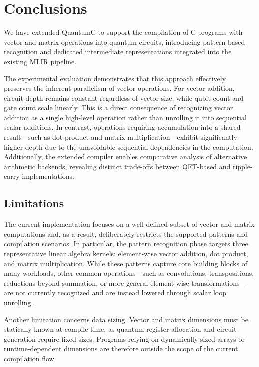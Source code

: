 \section{Conclusions}
\label{sec:conclusion}

We have extended QuantumC to support the compilation of C programs with vector and matrix operations into quantum circuits, introducing pattern-based recognition and dedicated intermediate representations integrated into the existing MLIR pipeline.

The experimental evaluation demonstrates that this approach effectively preserves the inherent parallelism of vector operations. For vector addition, circuit depth remains constant regardless of vector size, while qubit count and gate count scale linearly. This is a direct consequence of recognizing vector addition as a single high-level operation rather than unrolling it into sequential scalar additions. In contrast, operations requiring accumulation into a shared result—such as dot product and matrix multiplication—exhibit significantly higher depth due to the unavoidable sequential dependencies in the computation. Additionally, the extended compiler enables comparative analysis of alternative arithmetic backends, revealing distinct trade-offs between QFT-based and ripple-carry implementations.

\subsection{Limitations}
\label{sec:limitations}

The current implementation focuses on a well-defined subset of vector and matrix computations and, as a result, deliberately restricts the supported patterns and compilation scenarios. In particular, the pattern recognition phase targets three representative linear algebra kernels: element-wise vector addition, dot product, and matrix multiplication. While these patterns capture core building blocks of many workloads, other common operations—such as convolutions, transpositions, reductions beyond summation, or more general element-wise transformations—are not currently recognized and are instead lowered through scalar loop unrolling.

Another limitation concerns data sizing. Vector and matrix dimensions must be statically known at compile time, as quantum register allocation and circuit generation require fixed sizes. Programs relying on dynamically sized arrays or runtime-dependent dimensions are therefore outside the scope of the current compilation flow.

